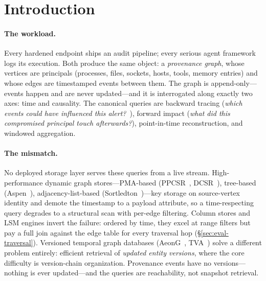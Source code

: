 \documentclass[11pt,letterpaper,twocolumn]{article}
\begin{document}
\section{Introduction}
\label{sec:intro}

\paragraph{The workload.}
Every hardened endpoint ships an audit pipeline; every serious agent
framework logs its execution. Both produce the same object: a
\emph{provenance graph}, whose vertices are principals (processes,
files, sockets, hosts, tools, memory entries) and whose edges are
timestamped events between them. The graph is append-only---events
happen and are never updated---and it is interrogated along exactly
two axes: time and causality. The canonical queries are backward
tracing (\emph{which events could have influenced this
alert?}~\cite{king2003backtracker}), forward impact (\emph{what did
this compromised principal touch afterwards?}), point-in-time
reconstruction, and windowed aggregation.

\paragraph{The mismatch.}
No deployed storage layer serves these queries from a live stream.
High-performance dynamic graph stores---PMA-based
(PPCSR~\cite{wheatman2021ppcsr}, DCSR~\cite{shen2026dcsr}), tree-based
(Aspen~\cite{dhulipala2019aspen}), adjacency-list-based
(Sortledton~\cite{fuchs2023sortledton})---key storage on
source-vertex identity and demote the timestamp to a payload
attribute, so a time-respecting query degrades to a structural scan
with per-edge filtering. Column stores and LSM engines invert the
failure: ordered by time, they excel at range filters but pay a full
join against the edge table for every traversal hop
(\S\ref{sec:eval-traversal}). Versioned temporal graph databases
(AeonG~\cite{hou2024aeong}, TVA~\cite{li2026tva}) solve a different
problem entirely: efficient retrieval of \emph{updated entity
versions}, where the core difficulty is version-chain organization.
Provenance events have no versions---nothing is ever updated---and the
queries are reachability, not snapshot retrieval.
\end{document}
